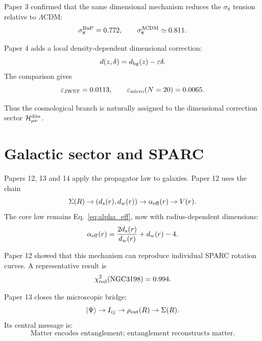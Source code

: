 \documentclass[11pt,a4paper]{article}
\begin{document}
Paper 3 confirmed that the same dimensional mechanism reduces the
\(\sigma_8\) tension relative to \(\Lambda\)CDM:
\begin{equation}
  \sigma_8^{\rm BuP}=0.772,
  \qquad
  \sigma_8^{\Lambda{\rm CDM}}\simeq0.811.
\end{equation}

Paper 4 adds a local density-dependent dimensional correction:
\begin{equation}
  d(z,\delta)=d_{\rm bg}(z)-\varepsilon\delta.
\end{equation}
The comparison gives
\begin{equation}
  \varepsilon_{\rm JWST}=0.0113,
  \qquad
  \varepsilon_{\rm micro}(N=20)=0.0065.
\end{equation}

Thus the cosmological branch is naturally assigned to the dimensional
correction sector \(\mathcal H_{\mu\nu}^{\rm dim}\).

\section{Galactic sector and SPARC}

Papers 12, 13 and 14 apply the propagator law to galaxies. Paper 12 uses the
chain
\begin{equation}
  \Sigma(R)
  \to
  (d_s(r),d_w(r))
  \to
  \alpha_{\rm eff}(r)
  \to
  V(r).
\end{equation}
The core law remains Eq.~\eqref{eq:alpha_eff}, now with radius-dependent
dimensions:
\begin{equation}
  \alpha_{\rm eff}(r)
  =
  \frac{2d_s(r)}{d_w(r)}
  +
  d_w(r)
  -
  4.
\end{equation}

Paper 12 showed that this mechanism can reproduce individual SPARC rotation
curves. A representative result is
\begin{equation}
  \chi^2_{\rm red}({\rm NGC3198})=0.994.
\end{equation}

Paper 13 closes the microscopic bridge:
\begin{equation}
  |\Psi\rangle
  \to
  I_{ij}
  \to
  \rho_{\rm ent}(R)
  \to
  \Sigma(R).
\end{equation}
Its central message is:
\begin{equation}
  \boxed{
  \text{Matter encodes entanglement; entanglement reconstructs matter.}
  }
\end{equation}
\end{document}
